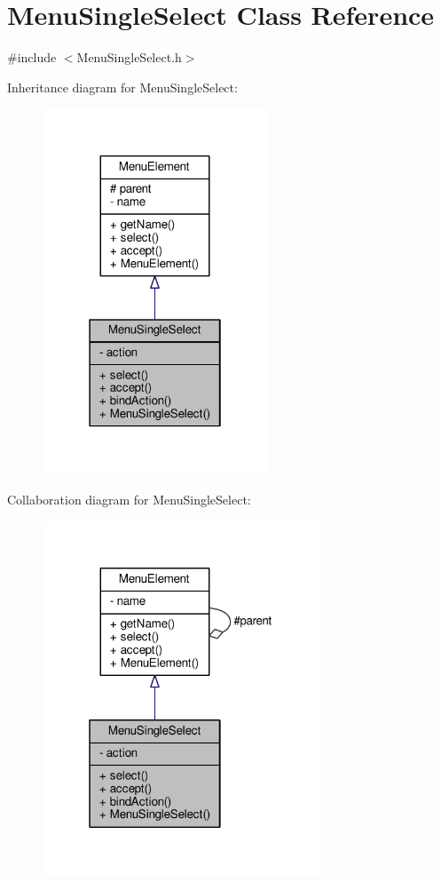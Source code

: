 \hypertarget{classMenuSingleSelect}{}\section{Menu\+Single\+Select Class Reference}
\label{classMenuSingleSelect}


{\ttfamily \#include $<$Menu\+Single\+Select.\+h$>$}



Inheritance diagram for Menu\+Single\+Select\+:
\nopagebreak
\begin{figure}[H]
\begin{center}
\leavevmode
\includegraphics[width=190pt]{classMenuSingleSelect__inherit__graph}
\end{center}
\end{figure}


Collaboration diagram for Menu\+Single\+Select\+:
\nopagebreak
\begin{figure}[H]
\begin{center}
\leavevmode
\includegraphics[width=235pt]{classMenuSingleSelect__coll__graph}
\end{center}
\end{figure}
